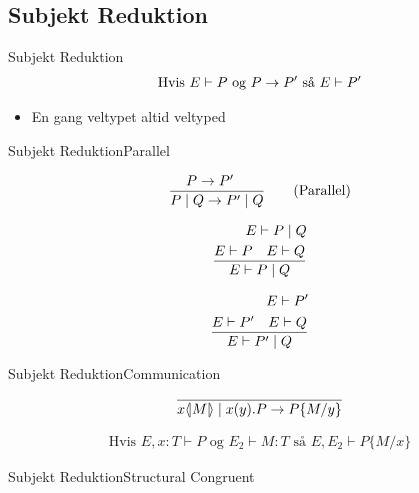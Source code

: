 \subsection{Subjekt Reduktion}
\begin{frame}{Subjekt Reduktion}
\begin{align*}
\text{Hvis } E \vdash P \text{ og } P \rightarrow P' \text{ så } E \vdash P'
\end{align*}
\begin{itemize}
\item En gang veltypet altid veltyped
\end{itemize}
\end{frame}

\begin{frame}{Subjekt Reduktion}{Parallel}

\begin{align*}
\frac{P \rightarrow P' \quad}{P \mid Q \rightarrow P' \mid Q} \tag{Parallel}\\
\end{align*}

\begin{align*}
E \vdash P \mid Q\\
\frac{E \vdash P \quad E \vdash Q}{E \vdash P \mid Q}\\
\end{align*}

\begin{align*}
E \vdash P'\\
\frac{E \vdash P' \quad E \vdash Q}{E \vdash P' \mid Q}
\end{align*}

\end{frame}

\begin{frame}{Subjekt Reduktion}{Communication}
\begin{align*}
\frac{}{x \langle \! | M | \! \rangle \mid x(y).P \rightarrow P\{M/y\}}
\end{align*}

\begin{align*}
\tag{Lemma substitution} \text{Hvis } E,x:T \vdash P \text{ og } E_2 \vdash M:T \text{ så } E,E_2\vdash P\{M/x\}
\end{align*}

\end{frame}

\begin{frame}{Subjekt Reduktion}{Structural Congruent}

\end{frame}


